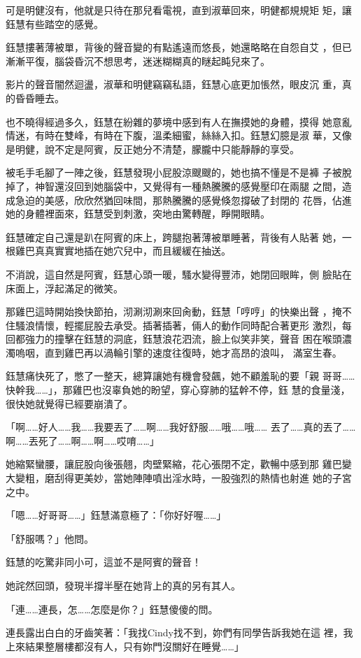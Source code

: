 可是明健沒有，他就是只待在那兒看電視，直到淑華回來，明健都規規矩
矩，讓鈺慧有些踏空的感覺。

鈺慧摟著薄被單，背後的聲音變的有點遙遠而悠長，她還略略在自怨自艾
，但已漸漸平復，腦袋昏沉不想思考，迷迷糊糊真的瞇起盹兒來了。

影片的聲音闇然迴盪，淑華和明健竊竊私語，鈺慧心底更加悵然，眼皮沉
重，真的昏昏睡去。

也不曉得經過多久，鈺慧在紛雜的夢境中感到有人在撫摸她的身體，摸得
她意亂情迷，有時在雙峰，有時在下腹，溫柔細蜜，絲絲入扣。鈺慧幻臆是淑
華，又像是明健，說不定是阿賓，反正她分不清楚，朦朧中只能靜靜的享受。

被毛手毛腳了一陣之後，鈺慧發現小屁股涼颼颼的，她也搞不懂是不是褲
子被脫掉了，神智還沒回到她腦袋中，又覺得有一種熱騰騰的感覺壓印在兩腿
之間，造成急迫的美感，欣欣然猶回味間，那熱騰騰的感覺倏忽撐破了封閉的
花唇，佔進她的身體裡面來，鈺慧受到刺激，突地由驚轉醒，睜開眼睛。

鈺慧確定自己還是趴在阿賓的床上，跨腿抱著薄被單睡著，背後有人貼著
她，一根雞巴真真實實地插在她穴兒中，而且緩緩在抽送。

不消說，這自然是阿賓，鈺慧心頭一暖，騷水變得豐沛，她閉回眼眸，側
臉貼在床面上，浮起滿足的微笑。

那雞巴這時開始換快節拍，沏涮沏涮來回肏動，鈺慧「哼哼」的快樂出聲
，掩不住騷浪情懷，輕擺屁股去承受。插著插著，倆人的動作同時配合著更形
激烈，每回都強力的撞擊在鈺慧的洞底，鈺慧浪花泗流，臉上似笑非笑，聲音
困在喉頭濃濁嗚咽，直到雞巴再以渦輪引擎的速度往復時，她才高昂的浪叫，
滿室生春。

鈺慧痛快死了，憋了一整天，總算讓她有機會發飆，她不顧羞恥的要「親
哥哥……快幹我……」，那雞巴也沒辜負她的盼望，穿心穿肺的猛幹不停，鈺
慧的食量淺，很快她就覺得已經要崩潰了。

「啊……好人……我……我要丟了……啊……我好舒服……哦……哦……
丟了……真的丟了……啊……丟死了……啊……啊……哎唷……」

她縮緊蠻腰，讓屁股向後張翹，肉壁緊縮，花心張閉不定，歡暢中感到那
雞巴變大變粗，磨刮得更美妙，當她陣陣噴出淫水時，一股強烈的熱情也射進
她的子宮之中。

「嗯……好哥哥……」鈺慧滿意極了：「你好好喔……」

「舒服嗎？」他問。

鈺慧的吃驚非同小可，這並不是阿賓的聲音！

她詫然回頭，發現半撐半壓在她背上的真的另有其人。

「連……連長，怎……怎麼是你？」鈺慧傻傻的問。

連長露出白白的牙齒笑著：「我找Cindy找不到，妳們有同學告訴我她在這
裡，我上來結果整層樓都沒有人，只有妳門沒關好在睡覺……」

